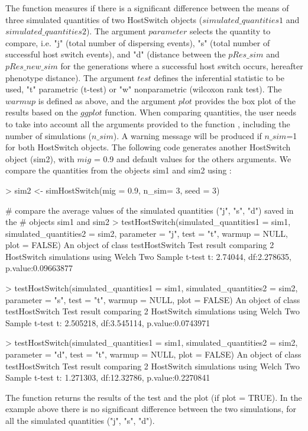 The  function measures if there is a significant difference between the means of three simulated quantities of two HostSwitch objects ($simulated\_quantities1$ and $simulated\_quantities2$).
The argument $parameter$ selects the quantity to compare, i.e. "j" (total number of dispersing events), "s" (total number of successful host switch events), and "d" (distance between the $pRes\_sim$ and $pRes\_new\_sim$ for the generations where a successful host switch occurs, hereafter phenotype distance).
The argument $test$ defines the inferential statistic to be used, "t" parametric (t-test) or "w" nonparametric (wilcoxon rank test). The $warmup$ is defined as above, and the argument $plot$ provides the box plot of the results based on the $ggplot$ function. When comparing quantities, the user needs to take into account all the arguments provided to the function , including the number of simulations ($n\_sim$). A warning message will be produced if $n\_sim$=1 for both HostSwitch objects.
The following code generates another HostSwitch object (sim2), with $mig$ = 0.9 and default values for the others arguments. We compare the quantities from the objects sim1 and sim2 using :
\begin{example}
  
  > sim2 <- simHostSwitch(mig = 0.9, n_sim= 3, seed = 3)
  
  # compare the average values of the simulated quantities ("j", "s", "d") saved in the
  # objects sim1 and sim2
  > testHostSwitch(simulated_quantities1 = sim1, simulated_quantities2 = sim2, 
    parameter = "j", test = "t", warmup = NULL, plot = FALSE)
    An object of class testHostSwitch
    Test result comparing 2 HostSwitch simulations using Welch Two Sample t-test 
    t: 2.74044, df:2.278635, p.value:0.09663877
    
  > testHostSwitch(simulated_quantities1 = sim1, simulated_quantities2 = sim2,
    parameter = "s", test = "t", warmup = NULL, plot = FALSE)
    An object of class testHostSwitch
    Test result comparing 2 HostSwitch simulations using Welch Two Sample t-test 
    t: 2.505218, df:3.545114, p.value:0.0743971
    
  > testHostSwitch(simulated_quantities1 = sim1, simulated_quantities2 = sim2,
    parameter = "d", test = "t", warmup = NULL, plot = FALSE)
    An object of class testHostSwitch
    Test result comparing 2 HostSwitch simulations using Welch Two Sample t-test 
    t: 1.271303, df:12.32786, p.value:0.2270841
  
\end{example}
The function returns the results of the test and the plot (if plot = TRUE). In the example above there is no significant difference between the two simulations, for all the simulated quantities ("j", "s", "d").

